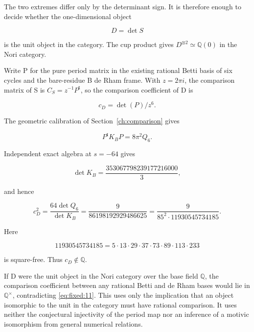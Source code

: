 \documentclass[11pt,a4paper,oneside]{article}
\theoremstyle{plain}
\theoremstyle{definition}
\theoremstyle{remark}
\numberwithin{equation}{section}
\begin{document}
The two extremes differ only by the determinant sign. It is therefore enough to decide whether the one-dimensional object

\begin{equation}
D=\det S
\end{equation}

is the unit object in the category. The cup product gives \(D^{\otimes2}\simeq\mathbb Q(0)\) in the Nori category.

Write P for the pure period matrix in the existing rational Betti basis of six cycles and the bare-residue B de Rham frame. With \(z=2\pi i\), the comparison matrix of S is \(C_S=z^{-1}P^{\mathsf t}\), so the comparison coefficient of D is

\begin{equation}
c_D=\det(P)/z^6.
\end{equation}

The geometric calibration of Section~\ref{ch:comparison} gives

\begin{equation}
P^{\mathsf t}K_BP=8\pi^2Q_6.
\end{equation}

Independent exact algebra at \(s=- 64\) gives

\begin{equation}
\det K_B=\frac{353067798239177216000}{3},
\end{equation}

and hence

\begin{equation}
\boxed{c_D^2=\frac{64\det Q_6}{\det K_B}
        =\frac9{86198192929486625}
        =\frac9{85^2\cdot11930545734185}.}                        \label{eq:fixed:11}
\end{equation}

Here

\begin{equation}
11930545734185=5\cdot13\cdot29\cdot37\cdot73\cdot89\cdot113\cdot233
\end{equation}

is square-free. Thus \(c_D\notin\mathbb Q\).

If D were the unit object in the Nori category over the base field \(\mathbb Q\), the comparison coefficient between any rational Betti and de Rham bases would lie in \(\mathbb Q^\times\), contradicting \eqref{eq:fixed:11}. This uses only the implication that an object isomorphic to the unit in the category must have rational comparison. It uses neither the conjectural injectivity of the period map nor an inference of a motivic isomorphism from general numerical relations.
\end{document}
